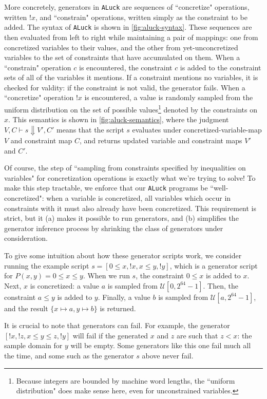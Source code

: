 \documentclass[10pt,a4paper]{article}
\begin{document}
More concretely, generators in \texttt{ALuck} are sequences of ``concretize" operations, written $!x$, and ``constrain" operations, written simply as the constraint to be added. The syntax of \texttt{ALuck} is shown in \autoref{fig:aluck-syntax}. These sequences are then evaluated from left to right while maintaining a pair of mappings: one from concretized variables to their values, and the other from yet-unconcretized variables to the set of constraints that have accumulated on them.
When a ``constrain" operation $c$ is encountered, the constraint $c$ is added to the constraint sets of all of the variables it mentions. If a constraint mentions no variables, it is checked for valdity: if the constraint is not valid, the generator fails. When a ``concretize" operation $!x$ is encountered, a value is randomly sampled from the uniform distribution on the set of possible values\footnote{
Because integers are bounded by machine word lengths, the ``uniform distribution" does make sense here, even for unconstrained variables.
} denoted by the constraints on $x$. This semantics is shown in \autoref{fig:aluck-semantics}, where the judgment $V,C \vdash s \Downarrow V',C'$ means that the script $s$ evaluates under concretized-variable-map $V$ and constraint map $C$, and returns updated variable and constraint maps $V'$ and $C'$.

Of course, the step of ``sampling from constraints specified by inequalities on variables" for concretization operations is exactly what we're trying to solve! To make this step tractable, we enforce that our \texttt{ALuck} programs be ``well-concretized": when a variable is concretized, all variables which occur in constraints with it must also already have been concretized. This requirement is strict, but it (a) makes it possible to run generators, and (b) simplifies the generator inference process by shrinking the class of generators under consideration.

To give some intuition about how these generator scripts work, we consider running the example script $s = [0 \leq x, !x, x \leq y, !y]$, which is a generator 
script for $P(x,y) = 0\leq x \leq y$. When we run $s$, the constraint $0 \leq x$ is added to $x$. Next, $x$ is concretized: a value $a$ is sampled from 
$\mathcal{U}\left[0,2^{64}-1\right]$. Then, the constraint $a \leq y$ is added to $y$. Finally, a value $b$ is sampled from $\mathcal{U}\left[a,2^{64}-1\right]$, and the result $\{x \mapsto a, y \mapsto b\}$ is returned.

It is crucial to note that generators can fail. For example, the generator $[!x,!z, x \leq y \leq z, !y]$ will fail if the generated $x$ and $z$ are such that $z < x$:  the sample domain for $y$ will be empty. Some generators like this one fail much all the time, and some such as the generator $s$ above never fail.
\end{document}
